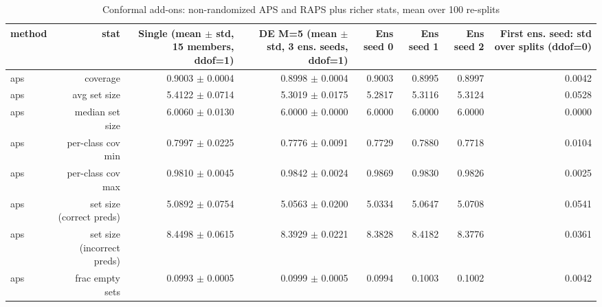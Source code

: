 \begin{table}
\centering
\caption{Conformal add-ons: non-randomized APS and RAPS plus richer stats, mean over 100 re-splits}
\label{tab:de_conformal_extras}
\begin{tabular}{lrrrrrrr}
\toprule
           method &                       stat & Single (mean $\pm$ std, 15 members, ddof=1) & DE M=5 (mean $\pm$ std, 3 ens. seeds, ddof=1) & Ens seed 0 & Ens seed 1 & Ens seed 2 & First ens. seed: std over splits (ddof=0) \\
\midrule
              aps &                   coverage &                         0.9003 $\pm$ 0.0004 &                           0.8998 $\pm$ 0.0004 &     0.9003 &     0.8995 &     0.8997 &                                    0.0042 \\
              aps &               avg set size &                         5.4122 $\pm$ 0.0714 &                           5.3019 $\pm$ 0.0175 &     5.2817 &     5.3116 &     5.3124 &                                    0.0528 \\
              aps &            median set size &                         6.0060 $\pm$ 0.0130 &                           6.0000 $\pm$ 0.0000 &     6.0000 &     6.0000 &     6.0000 &                                    0.0000 \\
              aps &          per-class cov min &                         0.7997 $\pm$ 0.0225 &                           0.7776 $\pm$ 0.0091 &     0.7729 &     0.7880 &     0.7718 &                                    0.0104 \\
              aps &          per-class cov max &                         0.9810 $\pm$ 0.0045 &                           0.9842 $\pm$ 0.0024 &     0.9869 &     0.9830 &     0.9826 &                                    0.0025 \\
              aps &   set size (correct preds) &                         5.0892 $\pm$ 0.0754 &                           5.0563 $\pm$ 0.0200 &     5.0334 &     5.0647 &     5.0708 &                                    0.0541 \\
              aps & set size (incorrect preds) &                         8.4498 $\pm$ 0.0615 &                           8.3929 $\pm$ 0.0221 &     8.3828 &     8.4182 &     8.3776 &                                    0.0361 \\
              aps &            frac empty sets &                         0.0993 $\pm$ 0.0005 &                           0.0999 $\pm$ 0.0005 &     0.0994 &     0.1003 &     0.1002 &                                    0.0042 \\

\end{tabular}
\end{table}
